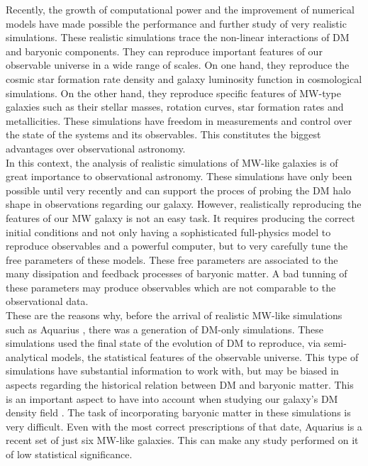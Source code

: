 \documentclass[12pt]{article}
\begin{document}
Recently, the growth of computational power and the improvement of numerical models have made possible the performance and further study of very realistic simulations.
These realistic simulations trace the non-linear interactions of DM and baryonic components. 
They can reproduce important features of our observable universe in a wide range of scales.
On one hand, they reproduce the cosmic star formation rate density and galaxy luminosity function in cosmological simulations.
On the other hand, they reproduce specific features of MW-type galaxies such as their stellar masses, rotation curves, star formation rates and metallicities. 
These simulations have freedom in measurements and control over the state of the systems and its observables.
This constitutes the biggest advantages over observational astronomy.\\

In this context, the analysis of realistic simulations of MW-like galaxies is of great importance to observational astronomy. 
These simulations have only been possible until very recently \cite{aquarius} and can support the proces of probing the DM halo shape in observations regarding our galaxy.
However, realistically reproducing the features of our MW galaxy is not an easy task. 
It requires producing the correct initial conditions and not only having a sophisticated full-physics model to reproduce observables and a powerful computer, but to very carefully tune the free parameters of these models. 
These free parameters are associated to the many dissipation and feedback processes of baryonic matter.
A bad tunning of these parameters may produce observables which are not comparable to the observational data.\\


These are the reasons why, before the arrival of realistic MW-like simulations such as Aquarius \cite{aquarius}, there was a generation of DM-only simulations.
These simulations used the final state of the evolution of DM to reproduce, via semi-analytical models, the statistical features of the observable universe. 
This type of simulations have substantial information to work with, but may be biased in aspects regarding the historical relation between DM and baryonic matter.
This is an important aspect to have into account when studying our galaxy's DM density field \cite{Bryan2012}.
The task of incorporating baryonic matter in these simulations is very difficult.
Even with the most correct prescriptions of that date, Aquarius is a recent set of just six MW-like galaxies.
This can make any study performed on it of low statistical significance.\\
\end{document}
